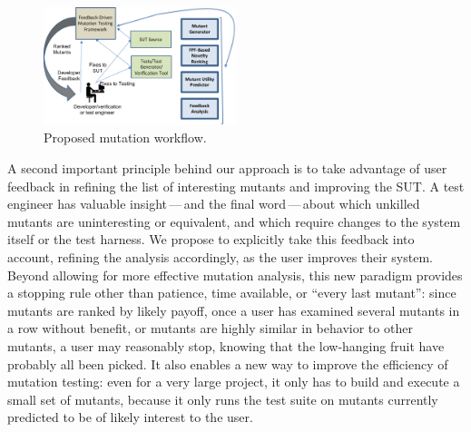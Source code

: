 \begin{figure}
\centering 
\includegraphics[width=0.5\textwidth]{TestFlow}

\caption{Proposed mutation workflow. }
\label{fig:flow}
\end{figure}



A second important principle behind our approach is to take advantage of user
feedback in refining the list of interesting mutants and improving the SUT.
A test engineer has valuable insight\,---\,and the final word\,---\,about which
unkilled mutants are uninteresting or equivalent, and which require changes to
the system itself or the test harness.  We propose to explicitly take this
feedback into account, refining the analysis accordingly, as the user improves
their system.  Beyond allowing for more effective mutation analysis,
this new paradigm provides a stopping rule other than patience, time available, or
``every last mutant'':  since mutants are ranked by likely payoff, once a user
has examined several mutants in a row without benefit, or mutants are highly
similar in behavior to other mutants, a user may reasonably stop, knowing that
the low-hanging fruit have probably all been picked.
 It also enables a new way to improve the efficiency of
mutation testing:  even for a very large project, it only has to build and
execute a small set of mutants, because it only runs the test suite on mutants
currently predicted to be of likely interest to the user.

